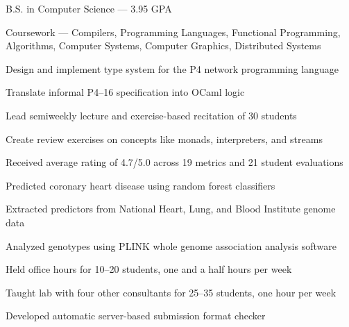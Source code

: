 \documentclass{resume}
\begin{document}
\begin{education}
    \begin{description}
        \item B.S. in Computer Science --- 3.95 GPA
        \item Coursework ---
            Compilers,
            Programming Languages,
            Functional Programming,
            Algorithms,
            Computer Systems,
            Computer Graphics,
            Distributed Systems
    \end{description}
\end{education}

\begin{experience}
    \begin{description}
        \item Design and implement type system for the P4 network programming language
        \item Translate informal P4--16 specification into OCaml logic
    \end{description}

    \begin{description}
        \item Lead semiweekly lecture and exercise-based recitation of 30 students
        \item Create review exercises on concepts like monads, interpreters, and streams
        \item Received average rating of 4.7/5.0 across 19 metrics and 21 student evaluations
    \end{description}

    \begin{description}
        \item Predicted coronary heart disease using random forest classifiers
        \item Extracted predictors from National Heart, Lung, and Blood Institute genome data
        \item Analyzed genotypes using PLINK whole genome association analysis software
    \end{description}

    \begin{description}
        \item Held office hours for 10--20 students, one and a half hours per week
        \item Taught lab with four other consultants for 25--35 students, one hour per week
        \item Developed automatic server-based submission format checker
    \end{description}
\end{experience}
\end{document}
